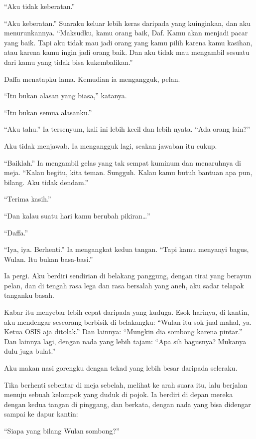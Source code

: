 \documentclass[11pt,twoside,openany]{book}
\makeatletter
\newcommand{\scenebreak}{\par\vspace{0.9em}{\centering\textsc{*\hspace{0.7em}*\hspace{0.7em}*}\par}\vspace{0.9em}\@afterindentfalse\@afterheading}
\makeatother
\begin{document}
``Aku tidak keberatan.''

``Aku keberatan.'' Suaraku keluar lebih keras daripada yang kuinginkan, dan aku menurunkannya. ``Maksudku, kamu orang baik, Daf. Kamu akan menjadi pacar yang baik. Tapi aku tidak mau jadi orang yang kamu pilih karena kamu kasihan, atau karena kamu ingin jadi orang baik. Dan aku tidak mau mengambil sesuatu dari kamu yang tidak bisa kukembalikan.''

Daffa menatapku lama. Kemudian ia mengangguk, pelan.

``Itu bukan alasan yang biasa,'' katanya.

``Itu bukan semua alasanku.''

``Aku tahu.'' Ia tersenyum, kali ini lebih kecil dan lebih nyata. ``Ada orang lain?''

Aku tidak menjawab. Ia mengangguk lagi, seakan jawaban itu cukup.

``Baiklah.'' Ia mengambil gelas yang tak sempat kuminum dan menaruhnya di meja. ``Kalau begitu, kita teman. Sungguh. Kalau kamu butuh bantuan apa pun, bilang. Aku tidak dendam.''

``Terima kasih.''

``Dan kalau suatu hari kamu berubah pikiran\ldots{}''

``Daffa.''

``Iya, iya. Berhenti.'' Ia mengangkat kedua tangan. ``Tapi kamu menyanyi bagus, Wulan. Itu bukan basa-basi.''

Ia pergi. Aku berdiri sendirian di belakang panggung, dengan tirai yang berayun pelan, dan di tengah rasa lega dan rasa bersalah yang aneh, aku sadar telapak tanganku basah.

\scenebreak
Kabar itu menyebar lebih cepat daripada yang kuduga. Esok harinya, di kantin, aku mendengar seseorang berbisik di belakangku: ``Wulan itu sok jual mahal, ya. Ketua OSIS aja ditolak.'' Dan lainnya: ``Mungkin dia sombong karena pintar.'' Dan lainnya lagi, dengan nada yang lebih tajam: ``Apa sih bagusnya? Mukanya dulu juga bulat.''

Aku makan nasi gorengku dengan tekad yang lebih besar daripada seleraku.

Tika berhenti sebentar di meja sebelah, melihat ke arah suara itu, lalu berjalan menuju sebuah kelompok yang duduk di pojok. Ia berdiri di depan mereka dengan kedua tangan di pinggang, dan berkata, dengan nada yang bisa didengar sampai ke dapur kantin:

``Siapa yang bilang Wulan sombong?''
\end{document}
